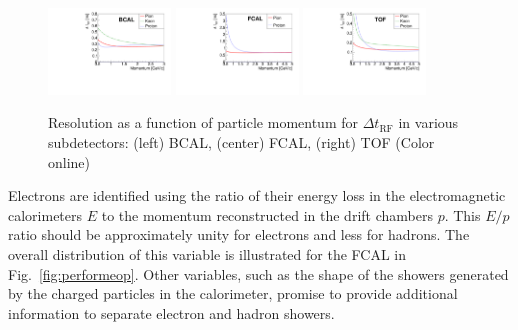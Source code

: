 \begin{figure}[tbp]
\begin{center}          
\includegraphics[width=0.29\textwidth]{figures/bcal_deltat_resol.pdf}
\includegraphics[width=0.29\textwidth]{figures/fcal_deltat_resol.pdf}
\includegraphics[width=0.29\textwidth]{figures/tof_deltat_resol.pdf}

\caption{\label{fig:timingresol}
Resolution as a function of particle momentum for  $\Delta t_\mathrm{RF}$ in various subdetectors: (left) BCAL, (center) FCAL, (right) TOF
 (Color online)}
\end{center}
\end{figure}


Electrons are identified using the ratio of their energy loss in the electromagnetic calorimeters $E$ to the momentum reconstructed in the drift chambers $p$.  This $E/p$ ratio should be approximately unity for electrons and less for hadrons.  The overall distribution of this variable is illustrated for the FCAL in  Fig.~\ref{fig:performeop}.  Other variables, such as the shape of the showers generated by the charged particles in the calorimeter, promise to provide additional information to separate electron and hadron showers.

